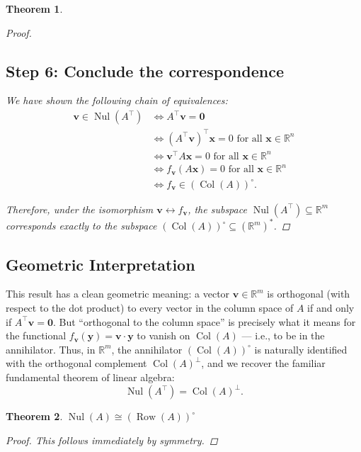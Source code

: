 \documentclass[11pt]{article}
\newcommand{\nul}{\operatorname{Nul}}
\newcommand{\col}{\operatorname{Col}}
\newcommand{\row}{\operatorname{Row}}
\newcommand{\R}{\mathbb{R}}
\newtheorem{theorem}{Theorem}
\begin{document}
\begin{theorem}
\begin{proof}
\subsection*{Step 6: Conclude the correspondence}

We have shown the following chain of equivalences:
\begin{align*}
\mathbf{v} \in \nul(A^\top) 
&\iff A^\top \mathbf{v} = \mathbf{0} \\
&\iff (A^\top \mathbf{v})^\top \mathbf{x} = 0 \text{ for all } \mathbf{x} \in \R^n \\
&\iff \mathbf{v}^\top A \mathbf{x} = 0 \text{ for all } \mathbf{x} \in \R^n \\
&\iff f_{\mathbf{v}}(A\mathbf{x}) = 0 \text{ for all } \mathbf{x} \in \R^n \\
&\iff f_{\mathbf{v}} \in (\col(A))^\circ.
\end{align*}

Therefore, under the isomorphism $\mathbf{v} \leftrightarrow f_{\mathbf{v}}$, the subspace $\nul(A^\top) \subseteq \R^m$ corresponds exactly to the subspace $(\col(A))^\circ \subseteq (\R^m)^*$.

\end{proof}
\end{theorem}

\subsection*{Geometric Interpretation}

This result has a clean geometric meaning:  
a vector $\mathbf{v} \in \R^m$ is orthogonal (with respect to the dot product) to every vector in the column space of $A$ if and only if $A^\top \mathbf{v} = \mathbf{0}$.  
But ``orthogonal to the column space'' is precisely what it means for the functional $f_{\mathbf{v}}(\mathbf{y}) = \mathbf{v} \cdot \mathbf{y}$ to vanish on $\col(A)$ — i.e., to be in the annihilator.  
Thus, in $\R^m$, the annihilator $(\col(A))^\circ$ is naturally identified with the orthogonal complement $\col(A)^\perp$, and we recover the familiar fundamental theorem of linear algebra:
\[
\nul(A^\top) = \col(A)^\perp.
\]







\begin{theorem}
$\nul(A) \cong (\row(A))^\circ$
\begin{proof}
This follows immediately by symmetry.
\end{proof}
\end{theorem}
\end{document}
